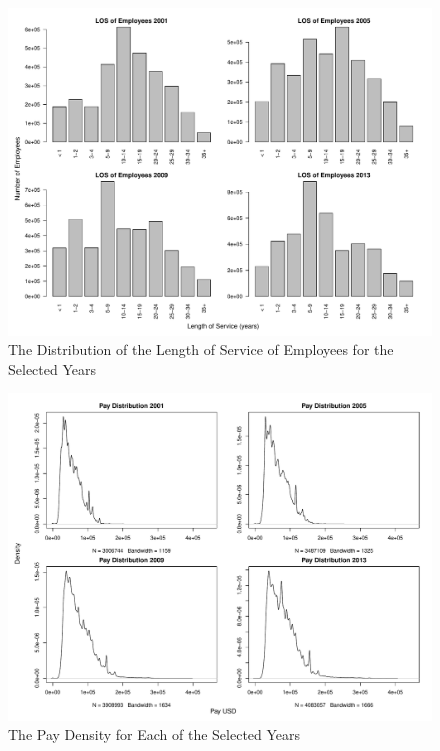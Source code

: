 \documentclass{article}
\begin{document}
\begin{center}
    \begin{figure}
        \includegraphics[scale=0.4]{./images/los-histograms.pdf}
        \caption{The Distribution of the Length of Service of Employees for the Selected Years}
        \label{loshistograms}
    \end{figure}
\end{center}

\begin{center}
    \begin{figure}
        \includegraphics[scale=0.4]{./images/pay-density.pdf}
        \caption{The Pay Density for Each of the Selected Years}
        \label{paydensities}
    \end{figure}
\end{center}
\end{document}
